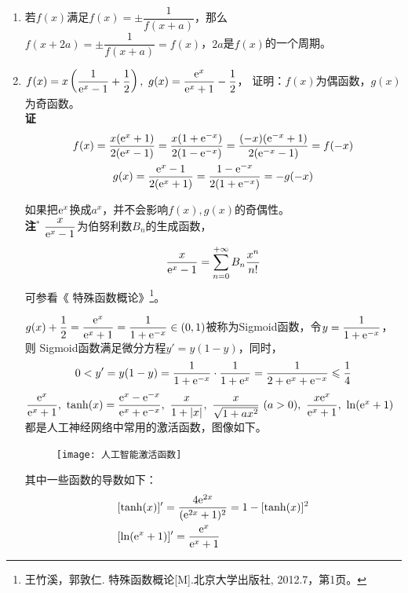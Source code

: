 \begin{enumerate}[label={【\textbf{例\thechapter.\arabic*}】},
 leftmargin=\inteval{\myenumleftmargin}pt,
 itemsep=\inteval{\myenumitempsep}pt,
 itemindent=\inteval{\myenumitemindent}pt]
\item 若$ f(x) $满足$ f(x)=\pm\dfrac{1}{f(x+a)} $，那么$ f(x+2a)=\pm
\dfrac{1}{f(x+a)}=f(x) $，$ 2a $是$ f(x) $的一个周期。

\item $ f(x)=x\left( \dfrac{1}{\mathrm{e}^x-1}+\dfrac{1}{2}\right),
\ g(x)=\dfrac{\mathrm{e}^x}{\mathrm{e}^x+1}-\dfrac{1}{2}  $，
证明：$ f(x) $为偶函数，$ g(x) $为奇函数。\\
\textbf{证}\ 
\begin{gather*}
f(x)=\dfrac{x(\mathrm{e}^x+1)}{2(\mathrm{e}^x-1)}=\dfrac{x(1+\mathrm{e}^{-x})}{2(1-\mathrm{e}^{-x})}
=\dfrac{(-x)(\mathrm{e}^{-x}+1)}{2(\mathrm{e}^{-x}-1)}=f(-x) \\
g(x)=\dfrac{\mathrm{e}^x-1}{2(\mathrm{e}^x+1)}=\dfrac{1-\mathrm{e}^{-x}}{2(1+\mathrm{e}^{-x})}=-g(-x)
\end{gather*}

如果把$ \mathrm{e}^x $换成$ a^x $，并不会影响$ f(x),g(x) $的奇偶性。\\
\textbf{注}$ ^* $ $ \dfrac{x}{\mathrm{e}^x-1} $为伯努利数$ B_n $的生成函数，
\begin{gather*}
    \dfrac{x}{\mathrm{e}^x-1}=\sum\limits_{n=0}^{+\infty}B_n\dfrac{x^n}{n!} 
\end{gather*}
可参看《 特殊函数概论》\footnote{
    王竹溪，郭敦仁. 特殊函数概论[M].北京大学出版社, 2012.7，第1页。}。

$ g(x)+\dfrac{1}{2}=\dfrac{\mathrm{e}^x}{\mathrm{e}^x+1}=\dfrac{1}{1+\mathrm{e}^{-x}}
\in (0,1) $被称为Sigmoid函数，令$ y=\dfrac{1}{1+\mathrm{e}^{-x}} $，则
Sigmoid函数满足微分方程$ y'=y(1-y) $，同时，
\begin{gather*}
    0<y'=y(1-y)=\dfrac{1}{1+\mathrm{e}^{-x}}\cdot\dfrac{1}{1+\mathrm{e}^{x}}
    =\dfrac{1}{2+\mathrm{e}^{x}+\mathrm{e}^{-x}}\leqslant\dfrac{1}{4}
\end{gather*}
$ \dfrac{\e^x}{\e^x+1},\ \tanh(x)=\dfrac{\e^x-\e^{-x}}{\e^x+\e^{-x}},\ 
\dfrac{x}{1+|x|},\ \dfrac{x}{\sqrt{1+ax^2}}\ (a>0),\ \dfrac{x\e^x}{\e^x+1},\ 
\ln(\e^x+1) $ 都是人工神经网络中常用的激活函数，图像如下。
\begin{figure}[h]   %
    \centering
    \texttt{[image: 人工智能激活函数]}
\end{figure} 
其中一些函数的导数如下：
\begin{align*}
    & [\tanh(x)]'=\dfrac{4\mathrm{e}^{2x}}{(\mathrm{e}^{2x}+1)^2}=1-[\tanh(x)]^2 \\
    & [\ln(\mathrm{e}^x+1)]'=\dfrac{\mathrm{e}^x}{\mathrm{e}^x+1}
\end{align*}


\end{enumerate}
